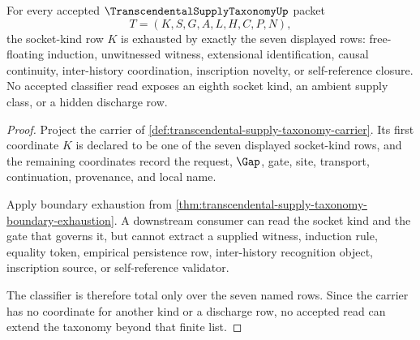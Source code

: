 \begin{theorem}
\label{thm:transcendental-supply-taxonomy-socket-kind-totality}
For every accepted $\TranscendentalSupplyTaxonomyUp$ packet
$$
T=(K,S,G,A,L,H,C,P,N),
$$
the socket-kind row $K$ is exhausted by exactly the seven displayed rows: free-floating induction, unwitnessed witness, extensional identification, causal continuity, inter-history coordination, inscription novelty, or self-reference closure. No accepted classifier read exposes an eighth socket kind, an ambient supply class, or a hidden discharge row.
\end{theorem}
\begin{proof}
Project the carrier of \autoref{def:transcendental-supply-taxonomy-carrier}. Its first coordinate $K$ is declared to be one of the seven displayed socket-kind rows, and the remaining coordinates record the request, $\Gap$, gate, site, transport, continuation, provenance, and local name.

Apply boundary exhaustion from \autoref{thm:transcendental-supply-taxonomy-boundary-exhaustion}. A downstream consumer can read the socket kind and the gate that governs it, but cannot extract a supplied witness, induction rule, equality token, empirical persistence row, inter-history recognition object, inscription source, or self-reference validator.

The classifier is therefore total only over the seven named rows. Since the carrier has no coordinate for another kind or a discharge row, no accepted read can extend the taxonomy beyond that finite list.
\end{proof}

